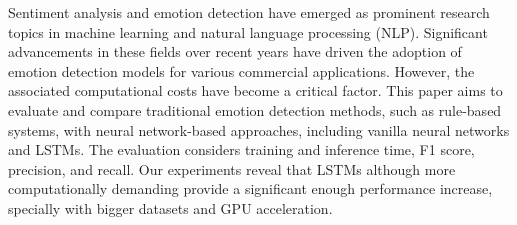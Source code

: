 Sentiment analysis and emotion detection have emerged as prominent research
topics in machine learning and natural language processing (NLP). Significant
advancements in these fields over recent years have driven the adoption of
emotion detection models for various commercial applications. However, the
associated computational costs have become a critical factor. This paper aims
to evaluate and compare traditional emotion detection methods, such as
rule-based systems, with neural network-based approaches, including vanilla
neural networks and LSTMs. The evaluation considers training and inference
time, F1 score, precision, and recall. Our experiments reveal that LSTMs
although more computationally demanding provide a significant enough
performance increase, specially with bigger datasets and GPU acceleration.
